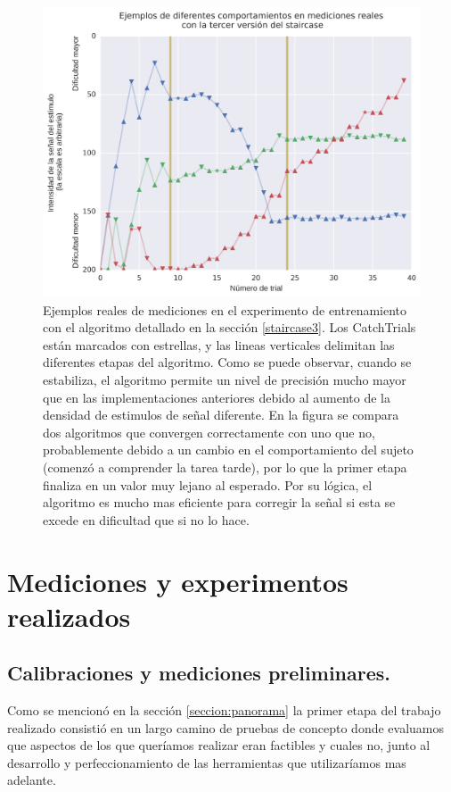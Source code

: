 \documentclass{article}
\begin{document}
    \begin{figure}
        \center
        \includegraphics[width=\textwidth]{Imagenes/StairCase3.png}
        \caption{Ejemplos reales de mediciones en el experimento de entrenamiento con el algoritmo detallado en la sección \ref{staircase3}. Los CatchTrials están marcados con estrellas, y las lineas verticales delimitan las diferentes etapas del algoritmo. Como se puede observar, cuando se estabiliza, el algoritmo permite un nivel de precisión mucho mayor que en las implementaciones anteriores debido al aumento de la densidad de estimulos de señal diferente. En la figura se compara dos algoritmos que convergen correctamente con uno que no, probablemente debido a un cambio en el comportamiento del sujeto (comenzó a comprender la tarea tarde), por lo que la primer etapa finaliza en un valor muy lejano al esperado. Por su lógica, el algoritmo es mucho mas eficiente para corregir la señal si esta se excede en dificultad que si no lo hace.}
        \label{fig:staircase3}
    \end{figure}  
    
\section{Mediciones y experimentos realizados}

\subsection{Calibraciones y mediciones preliminares.}

    Como se mencionó en la sección \ref{seccion:panorama} la primer etapa del trabajo realizado consistió en un largo camino de pruebas de concepto donde evaluamos que aspectos de los que queríamos realizar eran factibles y cuales no, junto al desarrollo y perfeccionamiento de las herramientas que utilizaríamos mas adelante. 
    
\end{document}
